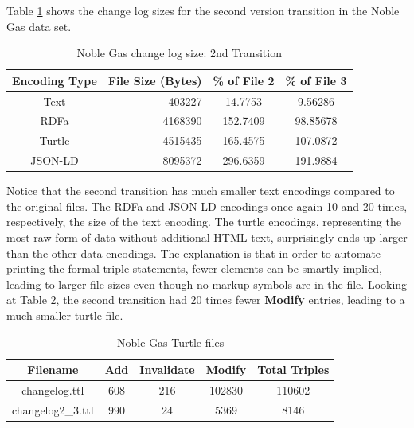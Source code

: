 Table \ref{table:Ng_changelog_table2} shows the change log sizes for the second version transition in the Noble Gas data set.
\begin{table}
	\caption{Noble Gas change log size: 2nd Transition}
	\label{table:Ng_changelog_table2}
	\centering
	\begin{tabular}{|c|r|c|c|}
		\hline
		Encoding Type & File Size (Bytes) & \% of File 2 & \% of File 3 \\
		\hline
		Text&	403227&	14.7753&	9.56286\\
		RDFa&	4168390&	152.7409&	98.85678\\
		Turtle&	4515435&	165.4575&	107.0872\\
		JSON-LD&	8095372&	296.6359&	191.9884\\
		\hline
	\end{tabular}
\end{table}
Notice that the second transition has much smaller text encodings compared to the original files.
The RDFa and JSON-LD encodings once again 10 and 20 times, respectively, the size of the text encoding.
The turtle encodings, representing the most raw form of data without additional HTML text, surprisingly ends up larger than the other data encodings.
The explanation is that in order to automate printing the formal triple statements, fewer elements can be smartly implied, leading to larger file sizes even though no markup symbols are in the file.
Looking at Table \ref{table:Ng_turtle}, the second transition had 20 times fewer \textbf{Modify} entries, leading to a much smaller turtle file.
\begin{table}
	\caption{Noble Gas Turtle files}
	\label{table:Ng_turtle}
	\centering
	\begin{tabular}{|c|c|c|c|c|}
		\hline
		Filename&	Add&	Invalidate&	Modify&	Total Triples\\ \hline
		changelog.ttl&	608&	216&	102830&	110602\\
		changelog2\_3.ttl&	990&	24&	5369&	8146\\
		\hline
	\end{tabular}
\end{table}

